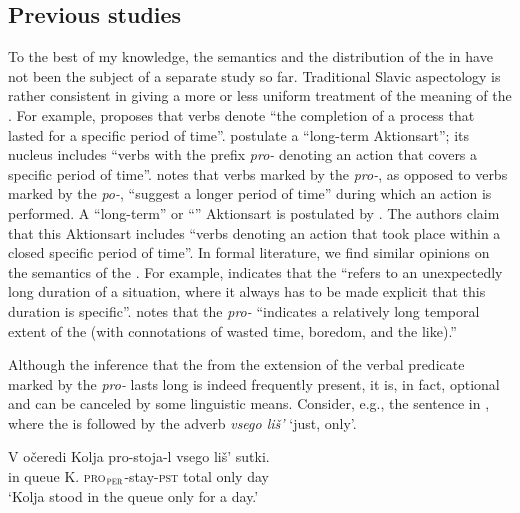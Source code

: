 \documentclass[output=paper,colorlinks,citecolor=brown,newtxmath]{langsci/langscibook}
\begin{document}
\subsection{Previous studies} \label{sec:naumov:3.2}
To the best of my knowledge, the semantics and the distribution of the  in  have not been the subject of a separate study so far. Traditional Slavic aspectology is rather consistent in giving a more or less uniform treatment of the meaning of the . For example, \cite[243--244]{isacenko1960grammaticeskij} proposes that  verbs denote ``the completion of a process that lasted for a specific period of time''. \cite[16]{bondarko1967} postulate a ``long-term Aktionsart''; its nucleus includes ``verbs with the prefix \textit{pro-} denoting an action that covers a specific period of time''. \cite[23]{forsyth1970grammar} notes that verbs marked by the  \textit{pro-}, as opposed to verbs marked by the  \textit{po-}, ``suggest a longer period of time'' during which an action is performed. A ``long-term'' or ``'' Aktionsart is postulated by \cite[112--113]{zalizniak2000}. The authors claim that this Aktionsart includes ``verbs denoting an action that took place within a closed specific period of time''. In formal literature, we find similar opinions on the semantics of the . For example, \cite[26]{gehrke2003aspectual} indicates that the  ``refers to an unexpectedly long duration of a situation, where it always has to be made explicit that this duration is specific''. \cite[32]{filip2005measures} notes that the  \textit{pro-} ``indicates a relatively long temporal extent of the  (with connotations of wasted time, boredom, and the like).''

Although the inference that the  from the extension of the verbal predicate marked by the  \textit{pro-} lasts long is indeed frequently present, it is, in fact, optional and can be canceled by some linguistic means. Consider, e.g., the sentence in , where the   is followed by the adverb \textit{vsego liš’} `just, only'.


\ea \label{ex:naumov:21}
\gll  V	očeredi		Kolja	pro-stoja-l		vsego	liš’	sutki.\\
in	queue		K.	\textsc{pro}$_\textsc{per}$-stay-\textsc{pst} total	only	day \\
\glt `Kolja stood in the queue only for a day.'
\z
\end{document}
